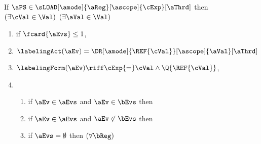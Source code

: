 \begin{definition}
  \medskip
  \noindent
  If $\aPS \in \sLOAD[\amode]{\aReg}[\ascope]{\cExp}[\aThrd]$ then
  $(\exists\cVal\in\Val)$
  $(\exists\aVal\in\Val)$
  \begin{multicols}{2}
    \begin{enumerate}[topsep=0pt,label=(\textsc{r}\arabic*),ref=\textsc{r}\arabic*]
    \item \label{read-E-addr}
      if $\fcard{\aEvs}\leq1$,
    \item \label{read-lambda-addr}
      $\labelingAct(\aEv) = \DR[\amode]{\REF{\cVal}}[\ascope]{\aVal}[\aThrd]$
    \item \label{read-kappa-addr}
      \begin{math}
        \labelingForm(\aEv) 
        \riff
        \cExp{=}\cVal
        \land \Q{\REF{\cVal}}
      \end{math},
    \item[] 
      \begin{enumerate}[leftmargin=0pt]
      \item \label{read-tau-dep-addr}
        if $\aEv\in\aEvs$ and $\aEv\in\bEvs$ then
        \makebox[0pt][l]{\begin{math}
            \aTr{\bEvs}{\bForm} \riff
            (\cExp{=}\cVal\limplies\aVal{=}\uReg{\aEv})
            \limplies \bForm[\uReg{\aEv}/\aReg]
          \end{math},}
      \item \label{read-tau-ind-addr}
        if $\aEv\in\aEvs$ and $\aEv\not\in\bEvs$ then
        \makebox[0pt][l]{\begin{math}
            \aTr{\bEvs}{\bForm} \riff
            \PBR{(\cExp{=}\cVal\limplies\aVal{=}\uReg{\aEv}) \lor (\cExp{=}\cVal\limplies\REF{\cVal}{=}\uReg{\aEv})}
            \limplies
            \bForm[\uReg{\aEv}/\aReg]
          \end{math},}
        \columnbreak
      \item \label{read-tau-empty-addr}
        if $\aEvs=\emptyset$ then 
        \begin{math}
          (\forall\bReg)
        \end{math}
        \begin{math}

\end{math}
\end{enumerate}
\end{enumerate}
\end{multicols}
\end{definition}
